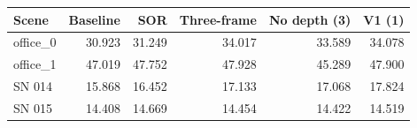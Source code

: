 \begin{tabular}{lrrrrr}
\toprule
Scene & Baseline & SOR & Three-frame & No depth (3) & V1 (1) \\
\midrule
office\_0 & 30.923 & 31.249 & 34.017 & 33.589 & 34.078 \\
office\_1 & 47.019 & 47.752 & 47.928 & 45.289 & 47.900 \\
SN 014 & 15.868 & 16.452 & 17.133 & 17.068 & 17.824 \\
SN 015 & 14.408 & 14.669 & 14.454 & 14.422 & 14.519 \\
\bottomrule
\end{tabular}
